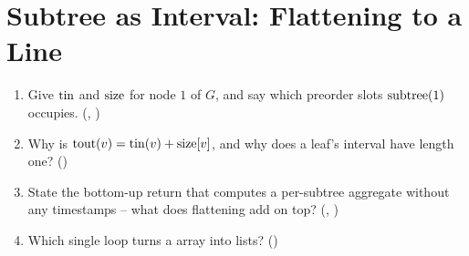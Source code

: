 \section{Subtree as Interval: Flattening to a Line}\label{sec:c24-flatten}

\begin{previouslybox}
\begin{enumerate}[nosep, leftmargin=1.6em]
  \item Give $\operatorname{tin}$ and $\operatorname{size}$ for node $1$ of $G$, and say which preorder slots
        $\operatorname{subtree}(1)$ occupies. (, )
  \item Why is $\operatorname{tout}(v) = \operatorname{tin}(v) + \operatorname{size}[v]$, and why does a leaf's interval have length
        one? ()
  \item State the bottom-up return that computes a per-subtree aggregate without any
        timestamps -- what does flattening add on top? (,
        )
  \item Which single loop turns a  array into  lists?
        ()
\end{enumerate}
\end{previouslybox}

